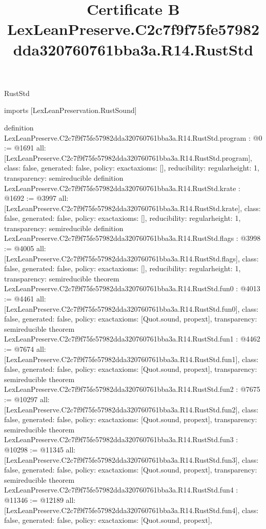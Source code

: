 \begin{lexlean}{RustStd}
\title{Certificate B LexLeanPreserve.C2c7f9f75fe57982dda320760761bba3a.R14.RustStd}
\begin{coremodule}
imports [LexLeanPreservation.RustSound]

definition LexLeanPreserve.C2c7f9f75fe57982dda320760761bba3a.R14.RustStd.program : @0 := @1691 {
  all: [LexLeanPreserve.C2c7f9f75fe57982dda320760761bba3a.R14.RustStd.program],
  class: false,
  generated: false,
  policy: exact{axioms: []},
  reducibility: regular{height: 1},
  transparency: semireducible
}
definition LexLeanPreserve.C2c7f9f75fe57982dda320760761bba3a.R14.RustStd.krate : @1692 := @3997 {
  all: [LexLeanPreserve.C2c7f9f75fe57982dda320760761bba3a.R14.RustStd.krate],
  class: false,
  generated: false,
  policy: exact{axioms: []},
  reducibility: regular{height: 1},
  transparency: semireducible
}
definition LexLeanPreserve.C2c7f9f75fe57982dda320760761bba3a.R14.RustStd.flags : @3998 := @4005 {
  all: [LexLeanPreserve.C2c7f9f75fe57982dda320760761bba3a.R14.RustStd.flags],
  class: false,
  generated: false,
  policy: exact{axioms: []},
  reducibility: regular{height: 1},
  transparency: semireducible
}
theorem LexLeanPreserve.C2c7f9f75fe57982dda320760761bba3a.R14.RustStd.fun0 : @4013 := @4461 {
  all: [LexLeanPreserve.C2c7f9f75fe57982dda320760761bba3a.R14.RustStd.fun0],
  class: false,
  generated: false,
  policy: exact{axioms: [Quot.sound, propext]},
  transparency: semireducible
}
theorem LexLeanPreserve.C2c7f9f75fe57982dda320760761bba3a.R14.RustStd.fun1 : @4462 := @7674 {
  all: [LexLeanPreserve.C2c7f9f75fe57982dda320760761bba3a.R14.RustStd.fun1],
  class: false,
  generated: false,
  policy: exact{axioms: [Quot.sound, propext]},
  transparency: semireducible
}
theorem LexLeanPreserve.C2c7f9f75fe57982dda320760761bba3a.R14.RustStd.fun2 : @7675 := @10297 {
  all: [LexLeanPreserve.C2c7f9f75fe57982dda320760761bba3a.R14.RustStd.fun2],
  class: false,
  generated: false,
  policy: exact{axioms: [Quot.sound, propext]},
  transparency: semireducible
}
theorem LexLeanPreserve.C2c7f9f75fe57982dda320760761bba3a.R14.RustStd.fun3 : @10298 := @11345 {
  all: [LexLeanPreserve.C2c7f9f75fe57982dda320760761bba3a.R14.RustStd.fun3],
  class: false,
  generated: false,
  policy: exact{axioms: [Quot.sound, propext]},
  transparency: semireducible
}
theorem LexLeanPreserve.C2c7f9f75fe57982dda320760761bba3a.R14.RustStd.fun4 : @11346 := @12189 {
  all: [LexLeanPreserve.C2c7f9f75fe57982dda320760761bba3a.R14.RustStd.fun4],
  class: false,
  generated: false,
  policy: exact{axioms: [Quot.sound, propext]},
}
\end{coremodule}
\end{lexlean}
